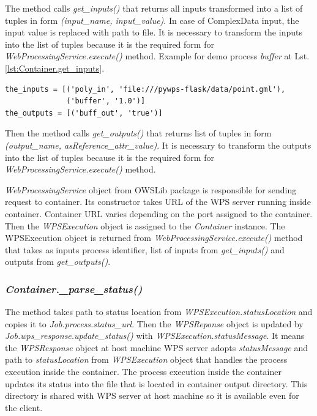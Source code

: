 The method calls \textit{get\_inputs()} that 
returns all inputs transformed into a list of tuples in form \textit{(input\_name, input\_value)}. In case of ComplexData input, the input value is replaced with path to file. It is necessary to transform the inputs into the list of tuples because it is the required form for
\textit{WebProcessingService.execute()} method. Example for demo process \textit{buffer} at Lst. \ref{lst:Container.get_inputs}.

\begin{lstlisting}[basicstyle=\small,caption={\textit{get\_inputs} return value},label={lst:Container.get_inputs}]
the_inputs = [('poly_in', 'file:///pywps-flask/data/point.gml'),
              ('buffer', '1.0')]
the_outputs = [('buff_out', 'true')]
\end{lstlisting}

Then the method calls \textit{get\_outputs()} that returns list of tuples in form \textit{(output\_name, asReference\_attr\_value)}. It is 
necessary to transform the outputs into the list of tuples because it is the required form for \textit{WebProcessingService.execute()} method. 

\textit{WebProcessingService} object from OWSLib package is responsible for sending request to container. Its constructor takes URL of the
WPS server running inside container. Container URL varies depending on the port assigned to the container. Then the \textit{WPSExecution}
object is assigned to the \textit{Container} instance. The WPS\-Execution object is returned from \textit{WebProcessingService.execute()} 
method that takes as inputs process identifier, list of inputs from \textit{get\_inputs()} and outputs from \textit{get\_outputs()}.

\subsubsection{\textit{Container.\_parse\_status()}}
The method takes path to status location from \textit{WPSExecution.statusLocation} and copies it to \textit{Job.process.status\_url}.
Then the \textit{WPSReponse} object is updated by \textit{Job.wps\_response.update\_status()} with \textit{WPSExecution.statusMessage}.
It means the \textit{WPSResponse} object at host machine WPS server adopts \textit{statusMessage} and path to \textit{statusLocation}
from \textit{WPSExecution} object that handles the process execution inside the container. The process execution inside the container
updates its status into the file that is located in container output directory. This directory is shared with WPS server at host machine
so it is available even for the client.

